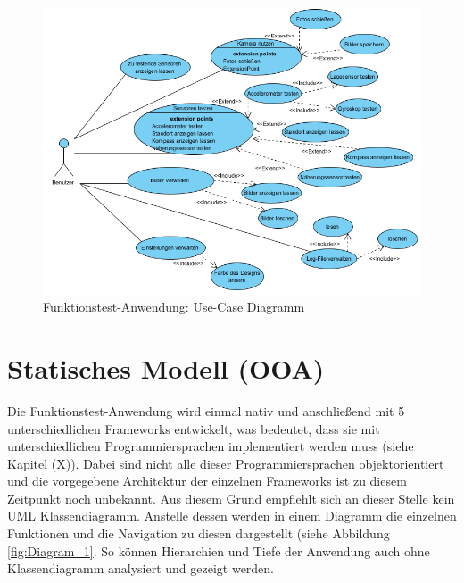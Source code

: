 \begin{figure}[h]
	\centering
	\includegraphics[width=1\textwidth]{Bilder/Use_Case.PNG}
	\caption{Funktionstest-Anwendung: Use-Case Diagramm}
	\label{fig:Use_Case}
\end{figure}

\section{Statisches Modell (OOA)}

Die Funktionstest-Anwendung wird einmal nativ und anschließend mit 5 unterschiedlichen Frameworks entwickelt, was bedeutet, dass sie mit unterschiedlichen Programmiersprachen implementiert werden muss (siehe Kapitel (X)). Dabei sind nicht alle dieser Programmiersprachen objektorientiert und die vorgegebene Architektur der einzelnen Frameworks ist zu diesem Zeitpunkt noch unbekannt. Aus diesem Grund empfiehlt sich an dieser Stelle kein UML Klassendiagramm. Anstelle dessen werden in einem Diagramm die einzelnen Funktionen und die Navigation zu diesen dargestellt (siehe Abbildung \ref{fig:Diagram_1}. So können Hierarchien und Tiefe der Anwendung auch ohne Klassendiagramm analysiert und gezeigt werden.  

